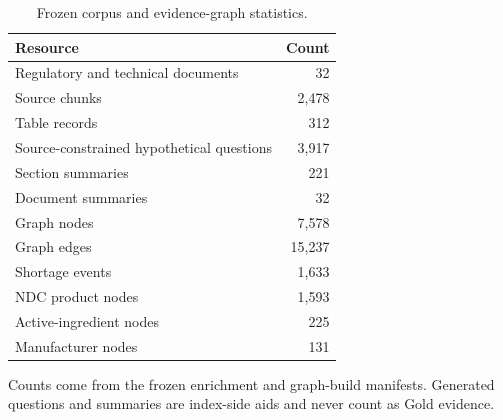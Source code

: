 \begin{table}[t]
\centering
\begin{threeparttable}
\caption{Frozen corpus and evidence-graph statistics.}
\label{tab:corpus}
\begin{tabular}{lr}
\toprule
Resource & Count \\
\midrule
Regulatory and technical documents & 32 \\
Source chunks & 2,478 \\
Table records & 312 \\
Source-constrained hypothetical questions & 3,917 \\
Section summaries & 221 \\
Document summaries & 32 \\
Graph nodes & 7,578 \\
Graph edges & 15,237 \\
Shortage events & 1,633 \\
NDC product nodes & 1,593 \\
Active-ingredient nodes & 225 \\
Manufacturer nodes & 131 \\
\bottomrule
\end{tabular}
\begin{tablenotes}[flushleft]\footnotesize
\item Counts come from the frozen enrichment and graph-build manifests. Generated questions and summaries are index-side aids and never count as Gold evidence.
\end{tablenotes}
\end{threeparttable}
\end{table}
